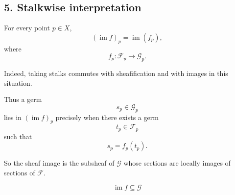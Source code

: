 \subsection*{5. Stalkwise interpretation}

For every point $p \in X$,
\[
(\operatorname{im} f)_p
=
\operatorname{im}(f_p),
\]
where
\[
f_p : \mathcal F_p \longrightarrow \mathcal G_p.
\]

Indeed, taking stalks commutes with sheafification and with images in this
situation.

Thus a germ
\[
s_p \in \mathcal G_p
\]
lies in $(\operatorname{im} f)_p$ precisely when there exists a germ
\[
t_p \in \mathcal F_p
\]
such that
\[
s_p = f_p(t_p).
\]

So the sheaf image is the subsheaf of $\mathcal G$ whose sections are locally
images of sections of $\mathcal F$.

\[
\boxed{
	\operatorname{im} f
	\subseteq
	\mathcal G
}
\]

\newpage
